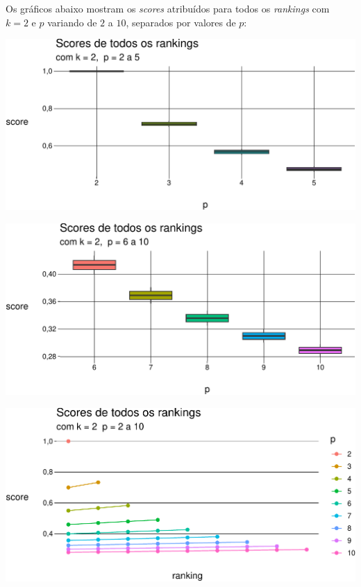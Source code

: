 \documentclass[
  letterpaper,
  DIV=11,
  numbers=noendperiod]{scrreprt}
\begin{document}
Os gráficos abaixo mostram os \emph{scores} atribuídos para todos os
\emph{rankings} com $k = 2$ e $p$ variando de $2$ a $10$, separados por
valores de $p$:

\begin{center}
\includegraphics[width=1\textwidth,height=\textheight]{usando-posicoes_files/figure-pdf/unnamed-chunk-7-1.pdf}
\end{center}

\begin{center}
\includegraphics[width=1\textwidth,height=\textheight]{usando-posicoes_files/figure-pdf/unnamed-chunk-8-1.pdf}
\end{center}

\begin{center}
\includegraphics[width=1\textwidth,height=\textheight]{usando-posicoes_files/figure-pdf/unnamed-chunk-9-1.pdf}
\end{center}
\end{document}
